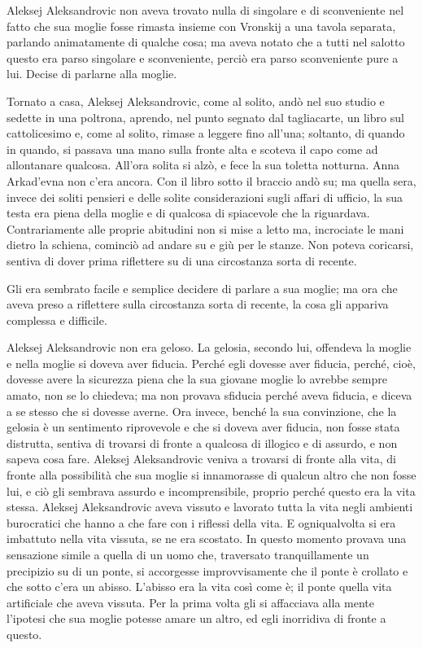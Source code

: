 Aleksej Aleksandrovic non aveva trovato nulla di singolare e di sconveniente nel fatto che sua moglie fosse rimasta insieme con Vronskij a una tavola separata, parlando animatamente di qualche cosa; ma aveva notato che a tutti nel salotto questo era parso singolare e sconveniente, perciò era parso sconveniente pure a lui. Decise di parlarne alla moglie. 

Tornato a casa, Aleksej Aleksandrovic, come al solito, andò nel suo studio e sedette in una poltrona, aprendo, nel punto segnato dal tagliacarte, un libro sul cattolicesimo e, come al solito, rimase a leggere fino all'una; soltanto, di quando in quando, si passava una mano sulla fronte alta e scoteva il capo come ad allontanare qualcosa. All'ora solita si alzò, e fece la sua toletta notturna. Anna Arkad'evna non c'era ancora. Con il libro sotto il braccio andò su; ma quella sera, invece dei soliti pensieri e delle solite considerazioni sugli affari di ufficio, la sua testa era piena della moglie e di qualcosa di spiacevole che la riguardava. Contrariamente alle proprie abitudini non si mise a letto ma, incrociate le mani dietro la schiena, cominciò ad andare su e giù per le stanze. Non poteva coricarsi, sentiva di dover prima riflettere su di una circostanza sorta di recente. 

Gli era sembrato facile e semplice decidere di parlare a sua moglie; ma ora che aveva preso a riflettere sulla circostanza sorta di recente, la cosa gli appariva complessa e difficile. 

Aleksej Aleksandrovic non era geloso. La gelosia, secondo lui, offendeva la moglie e nella moglie si doveva aver fiducia. Perché egli dovesse aver fiducia, perché, cioè, dovesse avere la sicurezza piena che la sua giovane moglie lo avrebbe sempre amato, non se lo chiedeva; ma non provava sfiducia perché aveva fiducia, e diceva a se stesso che si dovesse averne. Ora invece, benché la sua convinzione, che la gelosia è un sentimento riprovevole e che si doveva aver fiducia, non fosse stata distrutta, sentiva di trovarsi di fronte a qualcosa di illogico e di assurdo, e non sapeva cosa fare. Aleksej Aleksandrovic veniva a trovarsi di fronte alla vita, di fronte alla possibilità che sua moglie si innamorasse di qualcun altro che non fosse lui, e ciò gli sembrava assurdo e incomprensibile, proprio perché questo era la vita stessa. Aleksej Aleksandrovic aveva vissuto e lavorato tutta la vita negli ambienti burocratici che hanno a che fare con i riflessi della vita. E ogniqualvolta si era imbattuto nella vita vissuta, se ne era scostato. In questo momento provava una sensazione simile a quella di un uomo che, traversato tranquillamente un precipizio su di un ponte, si accorgesse improvvisamente che il ponte è crollato e che sotto c'era un abisso. L'abisso era la vita così come è; il ponte quella vita artificiale che aveva vissuta. Per la prima volta gli si affacciava alla mente l'ipotesi che sua moglie potesse amare un altro, ed egli inorridiva di fronte a questo. 

